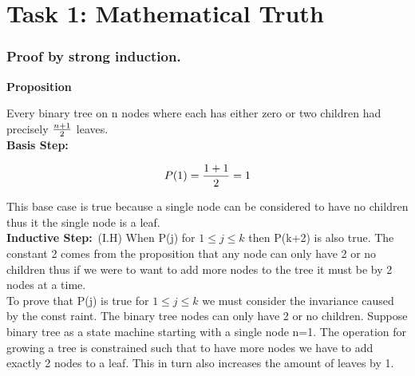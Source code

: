 \chapter{Task 1: Mathematical Truth}

\small \subsection*{Proof by strong induction.}

\textbf{Proposition}

Every binary tree on n nodes where each has either zero or two children had precisely ${n+1\over2}$ leaves.\\

\textbf{Basis Step:}\

\begin{align*}
    P(1) = {{1+1}\over 2} = 1
\end{align*}

This base case is true because a single node can be considered to have no children thus it the single node is a leaf.\\


\textbf{Inductive Step:}\
(I.H) When P(j) for $1 \leq j \leq k$  then P(k+2) is also true. The constant 2 comes from the proposition that any node can only have 2 or no children thus if we were to want to add more nodes to the tree it must be by 2 nodes at a time.\\

To prove that P(j) is true for $1 \leq j \leq k$ we must consider the invariance caused by the const raint. The binary tree nodes can only have 2 or no children. Suppose binary tree as a state machine starting with a single node n=1. The operation for growing a tree is constrained such that to have more nodes we have to add exactly 2 nodes to a leaf. This in turn also increases the amount of leaves by 1.


\begin{figure}[h]
	\centering

	

\end{figure}



